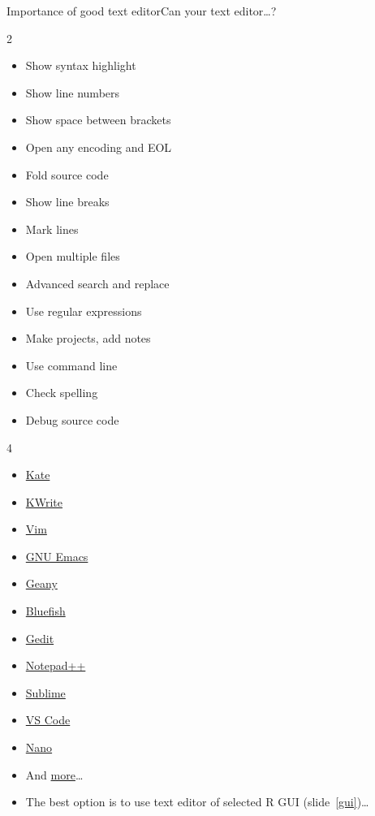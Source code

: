 \documentclass[compress, xelatex, 11pt, xcolor=svgnames, aspectratio=169, url={hyphens, lowtilde}]{beamer}
\begin{document}
\begin{frame}{Importance of good text editor}{Can your text editor\ldots ?}
	\label{editors}
	\begin{multicols}{2}
		\begin{itemize}
			\item Show syntax highlight
			\item Show line numbers
			\item Show space between brackets
			\item Open any encoding and EOL
			\item Fold source code
			\item Show line breaks
			\item Mark lines
			\item Open multiple files
			\item Advanced search and replace
			\item Use regular expressions
			\item Make projects, add notes
			\item Use command line
			\item Check spelling
			\item Debug source code
		\end{itemize}
	\end{multicols}
	\vfill
	\vfill
	\begin{multicols}{4}
		\begin{itemize}
			\item \href{https://kate-editor.org/}{Kate}
			\item \href{https://apps.kde.org/kwrite/}{KWrite}
			\item \href{https://www.vim.org/}{Vim}
			\item \href{https://en.wikipedia.org/wiki/Emacs}{GNU Emacs}
			\item \href{https://www.geany.org/}{Geany}
			\item \href{https://bluefish.openoffice.nl/}{Bluefish}
			\item \href{https://gedit-text-editor.org/}{Gedit}
			\item \href{https://notepad-plus-plus.org/}{Notepad++}
			\item \href{https://www.sublimetext.com/}{Sublime}
			\item \href{https://code.visualstudio.com/}{VS Code}
			\item \href{https://www.nano-editor.org/}{Nano}
			\item And \href{https://en.wikipedia.org/wiki/List_of_text_editors}{more}\ldots
		\end{itemize}
	\end{multicols}
	\vfill
	\begin{itemize}
		\item The best option is to use text editor of selected R GUI (slide~\ref{gui})\ldots
	\end{itemize}
\end{frame}
\end{document}

